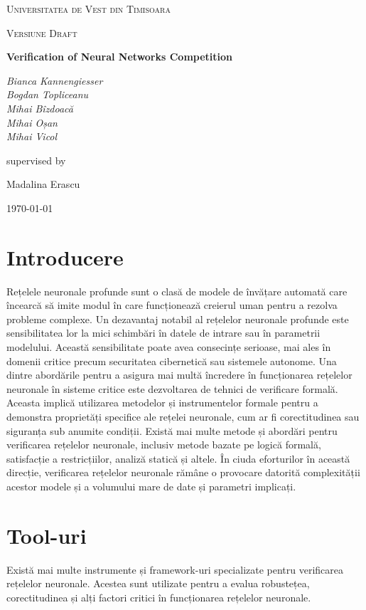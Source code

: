\documentclass[12pt,a4paper]{article}
\begin{document}
\begin{titlepage}
	\centering
	{\LARGE \textsc{Universitatea de Vest din Timisoara}\par}
	\vspace{1cm}
	{\Large \textsc{Versiune Draft}\par}
	\vspace{1.5cm}
	{\huge\bfseries Verification of Neural Networks Competition\par}
	\vspace{2cm}
	{\Large\itshape Bianca Kannengiesser\\
					Bogdan Topliceanu \\
					Mihai Bîzdoacă\\
					Mihai Oșan \\
					Mihai Vicol\par}
	\vfill
	supervised by\par
	Madalina Erascu 

	\vfill

	{\large \today\par}
\end{titlepage}

\section{Introducere}
Rețelele neuronale profunde sunt o clasă de modele de învățare automată care încearcă să imite modul în care funcționează creierul uman pentru a rezolva probleme complexe. Un dezavantaj notabil al rețelelor neuronale profunde este sensibilitatea lor la mici schimbări în datele de intrare sau în parametrii modelului. Această sensibilitate poate avea consecințe serioase, mai ales în domenii critice precum securitatea cibernetică sau sistemele autonome. Una dintre abordările pentru a asigura mai multă încredere în funcționarea rețelelor neuronale în sisteme critice este dezvoltarea de tehnici de verificare formală. Aceasta implică utilizarea metodelor și instrumentelor formale pentru a demonstra proprietăți specifice ale rețelei neuronale, cum ar fi corectitudinea sau siguranța sub anumite condiții. Există mai multe metode și abordări pentru verificarea rețelelor neuronale, inclusiv metode bazate pe logică formală, satisfacție a restricțiilor, analiză statică și altele. În ciuda eforturilor în această direcție, verificarea rețelelor neuronale rămâne o provocare datorită complexității acestor modele și a volumului mare de date și parametri implicați.
\section{Tool-uri}
Există mai multe instrumente și framework-uri specializate pentru verificarea rețelelor neuronale. Acestea sunt utilizate pentru a evalua robustețea, corectitudinea și alți factori critici în funcționarea rețelelor neuronale. 
\end{document}

